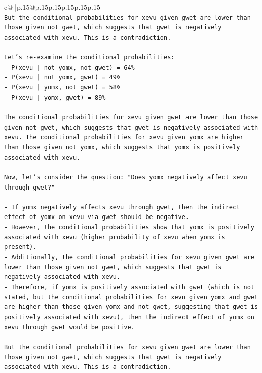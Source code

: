 \documentclass{article}
\begin{document}
{\begin{supertabular}{c@{$\;$}|p{.15\linewidth}@{}p{.15\linewidth}p{.15\linewidth}p{.15\linewidth}p{.15\linewidth}p{.15\linewidth}}
{{{\\ 
\texttt{But the conditional probabilities for xevu given gwet are lower than those given not gwet, which suggests that gwet is negatively associated with xevu. This is a contradiction.} \\
\\ 
\texttt{Let's re{-}examine the conditional probabilities:} \\
\texttt{{-}   P(xevu | not yomx, not gwet) = 64\%} \\
\texttt{{-}   P(xevu | not yomx, gwet) = 49\%} \\
\texttt{{-}   P(xevu | yomx, not gwet) = 58\%} \\
\texttt{{-}   P(xevu | yomx, gwet) = 89\%} \\
\\ 
\texttt{The conditional probabilities for xevu given gwet are lower than those given not gwet, which suggests that gwet is negatively associated with xevu. The conditional probabilities for xevu given yomx are higher than those given not yomx, which suggests that yomx is positively associated with xevu.} \\
\\ 
\texttt{Now, let's consider the question: "Does yomx negatively affect xevu through gwet?"} \\
\\ 
\texttt{{-}   If yomx negatively affects xevu through gwet, then the indirect effect of yomx on xevu via gwet should be negative.} \\
\texttt{{-}   However, the conditional probabilities show that yomx is positively associated with xevu (higher probability of xevu when yomx is present).} \\
\texttt{{-}   Additionally, the conditional probabilities for xevu given gwet are lower than those given not gwet, which suggests that gwet is negatively associated with xevu.} \\
\texttt{{-}   Therefore, if yomx is positively associated with gwet (which is not stated, but the conditional probabilities for xevu given yomx and gwet are higher than those given yomx and not gwet, suggesting that gwet is positively associated with xevu), then the indirect effect of yomx on xevu through gwet would be positive.} \\
\\ 
\texttt{But the conditional probabilities for xevu given gwet are lower than those given not gwet, which suggests that gwet is negatively associated with xevu. This is a contradiction.} \\
}}}
\end{supertabular}}
\end{document}
